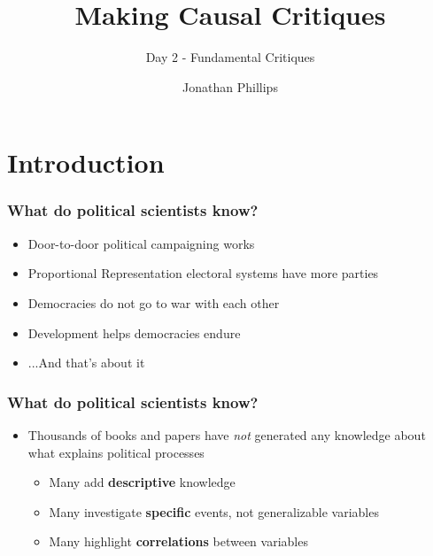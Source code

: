 \documentclass[xcolor=x11names,compress]{beamer}\usepackage[]{graphicx}\usepackage[]{color}
\title{Making Causal Critiques}
\subtitle{Day 2 - Fundamental Critiques}
\author{Jonathan Phillips}
\renewcommand{\(}{\begin{columns}}
\renewcommand{\)}{\end{columns}}
\newcommand{\<}[1]{\begin{column}{#1}}
\renewcommand{\>}{\end{column}}
\begin{document}
\frame{\titlepage}

\section{Introduction}

\begin{frame}
\frametitle{What do political scientists \textbf{know}?}
\begin{itemize}
\item Door-to-door political campaigning works
\item Proportional Representation electoral systems have more parties
\item Democracies do not go to war with each other
\item Development helps democracies endure
\item ...And that's about it
\end{itemize}
\end{frame}

\begin{frame}
\frametitle{What do political scientists \textbf{know}?}
\begin{itemize}
\item Thousands of books and papers have \textit{not} generated any knowledge about what explains political processes
\begin{itemize}
\item Many add \textbf{descriptive} knowledge
\item Many investigate \textbf{specific} events, not generalizable variables
\item Many highlight \textbf{correlations} between variables
\end{itemize}
\end{itemize}
\end{frame}
\end{document}
